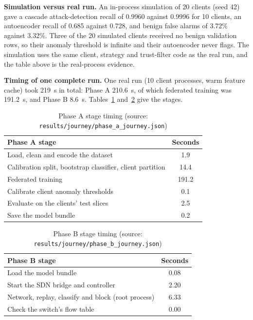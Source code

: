 \textbf{Simulation versus real run.} An in-process simulation of 20 clients (seed 42) gave a cascade attack-detection recall of 0.9960 against 0.9996 for 10 clients, an autoencoder recall of 0.685 against 0.728, and benign false alarms of 3.72\% against 3.32\%. Three of the 20 simulated clients received no benign validation rows, so their anomaly threshold is infinite and their autoencoder never flags. The simulation uses the same client, strategy and trust-filter code as the real run, and the table above is the real-process evidence.

\textbf{Timing of one complete run.} One real run (10 client processes, warm feature cache) took 219~s in total: Phase A 210.6~s, of which federated training was 191.2~s, and Phase B 8.6~s. Tables~\ref{tab:timea} and~\ref{tab:timeb} give the stages.

\begin{table}[H]
\centering
\renewcommand{\arraystretch}{1.2}
\begin{tabular}{|l|c|}
\hline
\textbf{Phase A stage} & \textbf{Seconds} \\ \hline
Load, clean and encode the dataset & 1.9 \\ \hline
Calibration split, bootstrap classifier, client partition & 14.4 \\ \hline
Federated training & 191.2 \\ \hline
Calibrate client anomaly thresholds & 0.1 \\ \hline
Evaluate on the clients' test slices & 2.5 \\ \hline
Save the model bundle & 0.2 \\ \hline
\end{tabular}
\caption{Phase A stage timing (source: \texttt{results/journey/phase\_a\_journey.json})}
\label{tab:timea}
\end{table}

\begin{table}[H]
\centering
\renewcommand{\arraystretch}{1.2}
\begin{tabular}{|l|c|}
\hline
\textbf{Phase B stage} & \textbf{Seconds} \\ \hline
Load the model bundle & 0.08 \\ \hline
Start the SDN bridge and controller & 2.20 \\ \hline
Network, replay, classify and block (root process) & 6.33 \\ \hline
Check the switch's flow table & 0.00 \\ \hline
\end{tabular}
\caption{Phase B stage timing (source: \texttt{results/journey/phase\_b\_journey.json})}
\label{tab:timeb}
\end{table}

